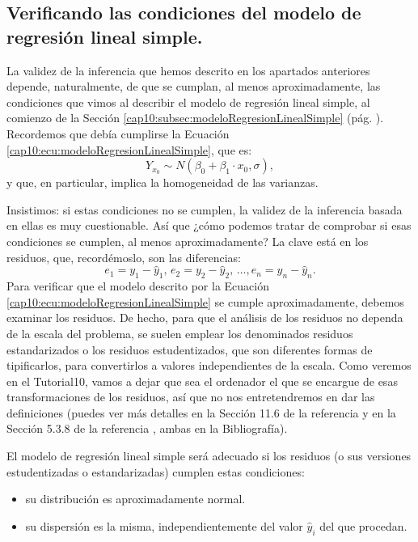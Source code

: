 \subsection{Verificando las condiciones del modelo de regresión lineal simple.}
\label{cap10:subsec:VerificandoCondicionesModeloRegresionLinealSimple}

La validez de la inferencia que hemos descrito en los apartados anteriores depende, naturalmente, de que se cumplan, al menos aproximadamente, las condiciones que vimos al describir el modelo de regresión lineal simple, al comienzo de la Sección \ref{cap10:subsec:modeloRegresionLinealSimple} (pág. \pageref{cap10:subsec:modeloRegresionLinealSimple}). Recordemos que debía cumplirse
la Ecuación \ref{cap10:ecu:modeloRegresionLinealSimple}, que es:
\[Y_{x_0}\sim N(\beta_0+\beta_1\cdot x_0,\sigma),\]
y que, en particular, implica la homogeneidad de las varianzas.

Insistimos: si estas condiciones no se cumplen, la validez de la inferencia basada en ellas es muy cuestionable. Así que ¿cómo podemos tratar de comprobar si esas condiciones se cumplen, al menos aproximadamente? La clave está en los residuos, que, recordémoslo, son las diferencias:
\[e_1=y_1-\hat y_1,\, e_2=y_2-\hat y_2,\, \ldots, e_n=y_n-\hat y_n.\]
Para verificar que el modelo descrito por la Ecuación \ref{cap10:ecu:modeloRegresionLinealSimple} se cumple aproximadamente, debemos examinar los residuos. De hecho, para que el análisis de los residuos no dependa de la escala del problema, se suelen emplear los denominados {\sf residuos estandarizados} o los {\sf residuos estudentizados}, que son diferentes formas de tipificarlos, para convertirlos a valores independientes de la escala. Como veremos en el Tutorial10, vamos a dejar que sea el ordenador el que se encargue de esas transformaciones de los residuos, así que no nos entretendremos en dar las definiciones (puedes ver más detalles en la Sección 11.6 de la referencia \cite{rosner2011fundamentals} y en la Sección 5.3.8 de la referencia \cite{quinn2002experimental}, ambas en la Bibliografía).

El modelo de regresión lineal simple será adecuado si los residuos (o sus versiones estudentizadas o estandarizadas) cumplen estas condiciones:
\begin{itemize}
  \item su distribución es aproximadamente normal.
  \item su dispersión es la misma, independientemente del valor $\hat y_i$ del que procedan.
\end{itemize}

